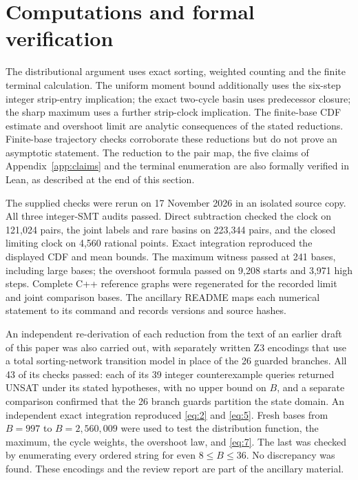 \documentclass[11pt]{amsart}
\begin{document}
\section{Computations and formal verification}\label{sec:verification}

The distributional argument uses exact sorting, weighted counting and the finite terminal calculation. The uniform moment bound additionally uses the six-step integer strip-entry implication; the exact two-cycle basin uses predecessor closure; the sharp maximum uses a further strip-clock implication. The finite-base CDF estimate and overshoot limit are analytic consequences of the stated reductions. Finite-base trajectory checks corroborate these reductions but do not prove an asymptotic statement. The reduction to the pair map, the five claims of Appendix~\ref{app:claims} and the terminal enumeration are also formally verified in Lean, as described at the end of this section.

The supplied checks were rerun on 17 November 2026 in an isolated source copy. All three integer-SMT audits passed. Direct subtraction checked the clock on 121,024 pairs, the joint labels and rare basins on 223,344 pairs, and the closed limiting clock on 4,560 rational points. Exact integration reproduced the displayed CDF and mean bounds. The maximum witness passed at 241 bases, including large bases; the overshoot formula passed on 9,208 starts and 3,971 high steps. Complete C++ reference graphs were regenerated for the recorded limit and joint comparison bases. The ancillary README maps each numerical statement to its command and records versions and source hashes.

An independent re-derivation of each reduction from the text of an earlier draft of this paper was also carried out, with separately written Z3 encodings that use a total sorting-network transition model in place of the 26 guarded branches. All 43 of its checks passed: each of its 39 integer counterexample queries returned UNSAT under its stated hypotheses, with no upper bound on \(B\), and a separate comparison confirmed that the 26 branch guards partition the state domain. An independent exact integration reproduced \eqref{eq:2} and \eqref{eq:5}. Fresh bases from \(B=997\) to \(B=2{,}560{,}009\) were used to test the distribution function, the maximum, the cycle weights, the overshoot law, and \eqref{eq:7}. The last was checked by enumerating every ordered string for even \(8\le B\le36\). No discrepancy was found. These encodings and the review report are part of the ancillary material.
\end{document}
